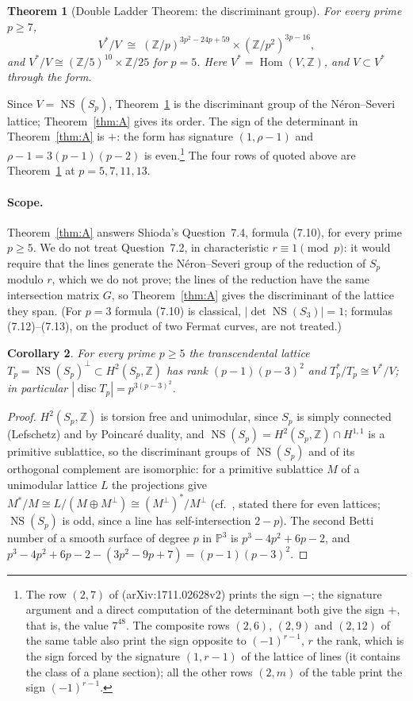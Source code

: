 \documentclass[11pt]{article}
\newtheorem{theorem}{Theorem}
\newtheorem{corollary}[theorem]{Corollary}
\theoremstyle{definition}
\theoremstyle{remark}
\newcommand{\Z}{\mathbb{Z}}
\newcommand{\Pp}{\mathbb{P}}
\newcommand{\NS}{\operatorname{NS}}
\begin{document}
\begin{theorem}[Double Ladder Theorem: the discriminant group]\label{thm:B}
For every prime $p\ge7$,
\[
V^\ast/V\;\cong\;(\Z/p)^{3p^2-24p+59}\times(\Z/p^2)^{3p-16},
\]
and $V^\ast/V\cong(\Z/5)^{10}\times\Z/25$ for $p=5$. Here $V^\ast=\operatorname{Hom}(V,\Z)$, and $V\subset V^\ast$ through the form.
\end{theorem}

Since $V=\NS(S_p)$, Theorem~\ref{thm:B} is the discriminant group of the N\'eron--Severi lattice; Theorem~\ref{thm:A} gives its order. The sign of the determinant in Theorem~\ref{thm:A} is $+$: the form has signature $(1,\rho-1)$ and $\rho-1=3(p-1)(p-2)$ is even.\footnote{The row $(2,7)$ of \cite[Table~1]{AMV} (arXiv:1711.02628v2) prints the sign $-$; the signature argument and a direct computation of the determinant both give the sign $+$, that is, the value $7^{48}$. The composite rows $(2,6)$, $(2,9)$ and $(2,12)$ of the same table also print the sign opposite to $(-1)^{r-1}$, $r$ the rank, which is the sign forced by the signature $(1,r-1)$ of the lattice of lines (it contains the class of a plane section); all the other rows $(2,m)$ of the table print the sign $(-1)^{r-1}$.} The four rows of \cite[Table~1]{AMV} quoted above are Theorem~\ref{thm:B} at $p=5,7,11,13$.

\paragraph{Scope.} Theorem~\ref{thm:A} answers Shioda's Question~7.4, formula (7.10), for every prime $p\ge5$. We do not treat Question~7.2, in characteristic $r\equiv1\pmod p$: it would require that the lines generate the N\'eron--Severi group of the reduction of $S_p$ modulo $r$, which we do not prove; the lines of the reduction have the same intersection matrix $G$, so Theorem~\ref{thm:A} gives the discriminant of the lattice they span. (For $p=3$ formula (7.10) is classical, $|\det\NS(S_3)|=1$; formulas (7.12)--(7.13), on the product of two Fermat curves, are not treated.)

\begin{corollary}\label{cor:T}
For every prime $p\ge5$ the transcendental lattice $T_p=\NS(S_p)^\perp\subset H^2(S_p,\Z)$ has rank $(p-1)(p-3)^2$ and $T_p^\ast/T_p\cong V^\ast/V$; in particular $|\operatorname{disc}T_p|=p^{3(p-3)^2}$.
\end{corollary}

\begin{proof}
$H^2(S_p,\Z)$ is torsion free and unimodular, since $S_p$ is simply connected (Lefschetz) and by Poincar\'e duality, and $\NS(S_p)=H^2(S_p,\Z)\cap H^{1,1}$ is a primitive sublattice, so the discriminant groups of $\NS(S_p)$ and of its orthogonal complement are isomorphic: for a primitive sublattice $M$ of a unimodular lattice $L$ the projections give $M^\ast/M\cong L/(M\oplus M^\perp)\cong(M^\perp)^\ast/M^\perp$ (cf.\ \cite[Prop.~1.6.1]{Nik}, stated there for even lattices; $\NS(S_p)$ is odd, since a line has self-intersection $2-p$). The second Betti number of a smooth surface of degree $p$ in $\Pp^3$ is $p^3-4p^2+6p-2$, and $p^3-4p^2+6p-2-(3p^2-9p+7)=(p-1)(p-3)^2$.
\end{proof}
\end{document}
